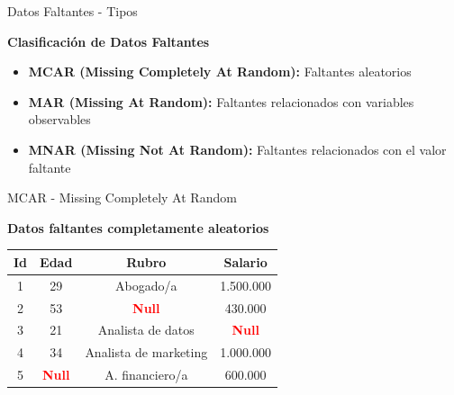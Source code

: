 \documentclass{beamer}
\begin{document}
\begin{frame}{Datos Faltantes - Tipos}
    \begin{center}
        \textbf{Clasificación de Datos Faltantes}
    \end{center}
    
    \vspace{0.5cm}
    
    \begin{itemize}
        \item<1->[{\makebox[1em][c]{\textcolor{black}{\faRandom}}}] \textbf{MCAR (Missing Completely At Random):} Faltantes aleatorios
        \item<2->[{\makebox[1em][c]{\textcolor{black}{\faLink}}}] \textbf{MAR (Missing At Random):} Faltantes relacionados con variables observables
        \item<3->[{\makebox[1em][c]{\textcolor{black}{\faExclamation}}}] \textbf{MNAR (Missing Not At Random):} Faltantes relacionados con el valor faltante
    \end{itemize}
\end{frame}

\begin{frame}{MCAR - Missing Completely At Random}
    \begin{center}
        \textbf{Datos faltantes completamente aleatorios}
    \end{center}
    
    \vspace{0.3cm}
    
    \begin{center}
    \begin{tabular}{|c|c|c|c|}
    \hline
    \textbf{Id} & \textbf{Edad} & \textbf{Rubro} & \textbf{Salario} \\
    \hline
    1 & 29 & Abogado/a & 1.500.000 \\
    \hline
    2 & 53 & \textcolor{red}{\textbf{Null}} & 430.000 \\
    \hline
    3 & 21 & Analista de datos & \textcolor{red}{\textbf{Null}} \\
    \hline
    4 & 34 & Analista de marketing & 1.000.000 \\
    \hline
    5 & \textcolor{red}{\textbf{Null}} & A. financiero/a & 600.000 \\
    \hline
    \end{tabular}
    \end{center}
    
    \vspace{0.3cm}
    
\end{frame}
\end{document}
